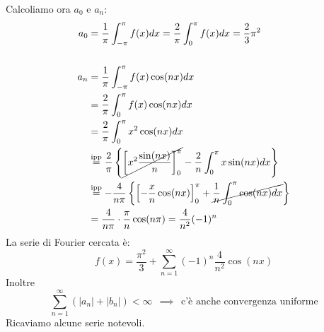 Calcoliamo ora $a_{0}$ e $a_{n}$:
\begin{align*}
a_{0} & = \frac{1}{\pi }\int ^{\pi }_{ - \pi } f(x)dx = \frac{2}{\pi }\int ^{\pi }_{0} f(x)dx = \frac{2}{3} \pi ^{2}\\
 & \\
a_{n} & = \frac{1}{\pi }\int ^{\pi }_{ - \pi } f(x)\cos(nx) dx\\
 & = \frac{2}{\pi }\int ^{\pi }_{0} f(x)\cos (nx)dx\\
 & = \frac{2}{\pi }\int ^{\pi }_{0} x^{2}\cos (nx)dx\\
 & \overset{\text{ipp}}{ = }\frac{2}{\pi }\left\{\cancel{\left[ x^{2}\frac{\sin (nx)}{n}\right]^{\pi }_{0}} - \frac{2}{n}\int ^{\pi }_{0} x\sin (nx)dx\right\}\\
 & \overset{\text{ipp}}{ = } - \frac{4}{n\pi }\left\{\left[ - \frac{x}{n}\cos(nx)\right]^{\pi }_{0} + \cancel{\frac{1}{n}\int ^{\pi }_{0}\cos(nx) dx}\right\}\\
 & = \frac{4}{n\pi } \cdot \frac{\pi }{n}\cos(n\pi) = \frac{4}{n^{2}}(- 1)^{n}
\end{align*}
La serie di Fourier cercata è:
\begin{equation*}
f(x) = \frac{\pi ^{2}}{3} + \sum ^{\infty }_{n = 1} (- 1)^{n}\frac{4}{n^{2}}\cos (nx)
\end{equation*}
Inoltre
\begin{equation*}
\sum ^{\infty }_{n = 1}(|a_{n} | + |b_{n} |) < \infty \ \ \implies \ \ \text{c'è anche convergenza uniforme}
\end{equation*}
Ricaviamo alcune serie notevoli.
